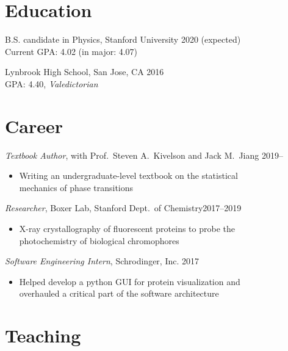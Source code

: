 \documentclass[margin,11pt]{res}
\newenvironment{myitemize}
{ \vspace{-1.5\topsep} \begin{itemize} }
{ \end{itemize} \vspace{-1.0\topsep}}
\begin{document}
\address{jeffjar@stanford.edu --- \url{https://stanford.edu/~jeffjar}}

\begin{resume}

\section{Education}

B.S. candidate in Physics, Stanford University \hfill 2020 (expected) \\
Current GPA: 4.02 (in major: 4.07)
 
Lynbrook High School, San Jose, CA \hfill 2016 \\
GPA: 4.40, \textit{Valedictorian}

\section{Career}

\textit{Textbook Author}, with Prof.\ Steven A.\ Kivelson and Jack M.\ Jiang  \hfill 2019--\\
\begin{myitemize}
    \item Writing an undergraduate-level textbook on the statistical\\
        mechanics of phase transitions
\end{myitemize}

\textit{Researcher}, Boxer Lab, Stanford Dept.\ of Chemistry\hfill 2017--2019 \\
\begin{myitemize}
    \item X-ray crystallography of fluorescent proteins to probe the\\ photochemistry of biological chromophores
\end{myitemize}

\textit{Software Engineering Intern}, Schrodinger, Inc. \hfill 2017 \\
\begin{myitemize}
    \item Helped develop a python GUI for protein visualization and \\overhauled a critical part of the software architecture
\end{myitemize}

\section{Teaching}


\end{resume}
\end{document}

